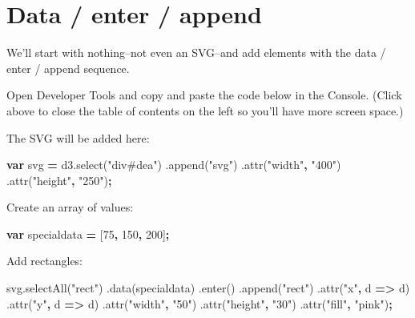 \documentclass[openany]{book}
\newenvironment{Shaded}{\begin{snugshade}}{\end{snugshade}}
\newcommand{\AttributeTok}[1]{\textcolor[rgb]{0.77,0.63,0.00}{#1}}
\newcommand{\DecValTok}[1]{\textcolor[rgb]{0.00,0.00,0.81}{#1}}
\newcommand{\KeywordTok}[1]{\textcolor[rgb]{0.13,0.29,0.53}{\textbf{#1}}}
\newcommand{\NormalTok}[1]{#1}
\newcommand{\OperatorTok}[1]{\textcolor[rgb]{0.81,0.36,0.00}{\textbf{#1}}}
\newcommand{\StringTok}[1]{\textcolor[rgb]{0.31,0.60,0.02}{#1}}
\newcommand{\VariableTok}[1]{\textcolor[rgb]{0.00,0.00,0.00}{#1}}
\begin{document}
\hypertarget{data-enter-append}{%
\section{Data / enter / append }\label{data-enter-append}}

We'll start with nothing--not even an SVG--and add elements with the data / enter / append sequence.

Open Developer Tools and copy and paste the code below in the Console. (Click above to close the table of contents on the left so you'll have more screen space.)

The SVG will be added here:

\hypertarget{dea}{}

\begin{Shaded}
\begin{Highlighting}[]
\KeywordTok{var}\NormalTok{ svg }\OperatorTok{=} \VariableTok{d3}\NormalTok{.}\AttributeTok{select}\NormalTok{(}\StringTok{"div#dea"}\NormalTok{)}
\NormalTok{  .}\AttributeTok{append}\NormalTok{(}\StringTok{"svg"}\NormalTok{)}
\NormalTok{  .}\AttributeTok{attr}\NormalTok{(}\StringTok{"width"}\OperatorTok{,} \StringTok{"400"}\NormalTok{)}
\NormalTok{  .}\AttributeTok{attr}\NormalTok{(}\StringTok{"height"}\OperatorTok{,} \StringTok{"250"}\NormalTok{)}\OperatorTok{;}
\end{Highlighting}
\end{Shaded}

Create an array of values:

\begin{Shaded}
\begin{Highlighting}[]
\KeywordTok{var}\NormalTok{ specialdata }\OperatorTok{=}\NormalTok{ [}\DecValTok{75}\OperatorTok{,} \DecValTok{150}\OperatorTok{,} \DecValTok{200}\NormalTok{]}\OperatorTok{;}
\end{Highlighting}
\end{Shaded}

Add rectangles:

\begin{Shaded}
\begin{Highlighting}[]
  \VariableTok{svg}\NormalTok{.}\AttributeTok{selectAll}\NormalTok{(}\StringTok{"rect"}\NormalTok{)}
\NormalTok{    .}\AttributeTok{data}\NormalTok{(specialdata)}
\NormalTok{    .}\AttributeTok{enter}\NormalTok{()}
\NormalTok{    .}\AttributeTok{append}\NormalTok{(}\StringTok{"rect"}\NormalTok{)}
\NormalTok{      .}\AttributeTok{attr}\NormalTok{(}\StringTok{"x"}\OperatorTok{,}\NormalTok{ d }\OperatorTok{=>}\NormalTok{ d)}
\NormalTok{      .}\AttributeTok{attr}\NormalTok{(}\StringTok{"y"}\OperatorTok{,}\NormalTok{ d }\OperatorTok{=>}\NormalTok{ d)}
\NormalTok{      .}\AttributeTok{attr}\NormalTok{(}\StringTok{"width"}\OperatorTok{,} \StringTok{"50"}\NormalTok{)}
\NormalTok{      .}\AttributeTok{attr}\NormalTok{(}\StringTok{"height"}\OperatorTok{,} \StringTok{"30"}\NormalTok{)}
\NormalTok{      .}\AttributeTok{attr}\NormalTok{(}\StringTok{"fill"}\OperatorTok{,} \StringTok{"pink"}\NormalTok{)}\OperatorTok{;}
\end{Highlighting}
\end{Shaded}
\end{document}
